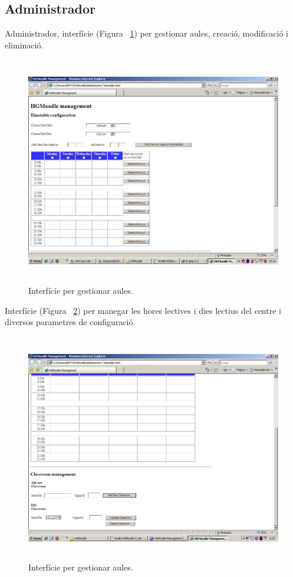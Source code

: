 \documentclass[a4paper]{report}  %
\begin{document}
\subsection{Administrador}
Administrador, interfície (Figura ~\ref{fig:Administrator-Timetable}) per gestionar aules, creació, modificació i eliminació. 
		\begin{figure}[H] %
		\begin{center}
		\includegraphics[width=12cm,height=10cm]{img/Administrator-Timetable.jpg}
		\caption[List caption]{Interfície per gestionar aules.}
		\label{fig:Administrator-Timetable}
		\end{center}
		\end{figure}
Interfície (Figura ~\ref{fig:Administrator-Timetable-2}) per manegar les hores lectives i dies lectius del centre i diversos parametres de configuració.
		\begin{figure}[H] %
		\begin{center}
		\includegraphics[width=12cm,height=10cm]{img/Administrator-Timetable-2.jpg}
		\caption[List caption]{Interfície per gestionar aules.}
		\label{fig:Administrator-Timetable-2}
		\end{center}
		\end{figure}
\end{document}
